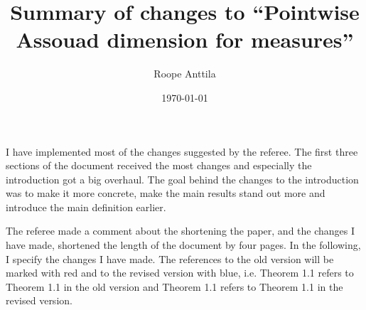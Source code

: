 \documentclass[12pt]{amsart}
\numberwithin{equation}{section}
\newcommand{\old}[1]{{\color{red} #1}}
\newcommand{\new}[1]{{\color{blue} #1}}
\theoremstyle{plain}
\theoremstyle{definition}
\theoremstyle{remark}
\begin{document}
\title{Summary of changes to ``Pointwise Assouad dimension for measures''}
\author{Roope Anttila}

\date{\today}

\maketitle

I have implemented most of the changes suggested by the referee. The first three sections of the document received the most changes and especially the introduction got a big overhaul. The goal behind the changes to the introduction was to make it more concrete, make the main results stand out more and introduce the main definition earlier.

The referee made a comment about the shortening the paper, and the changes I have made, shortened the length of the document by four pages. In the following, I specify the changes I have made. The references to the old version will be marked with \old{red} and to the revised version with \new{blue}, i.e. \old{Theorem 1.1} refers to Theorem 1.1 in the old version and \new{Theorem 1.1} refers to Theorem 1.1 in the revised version.
\end{document}
